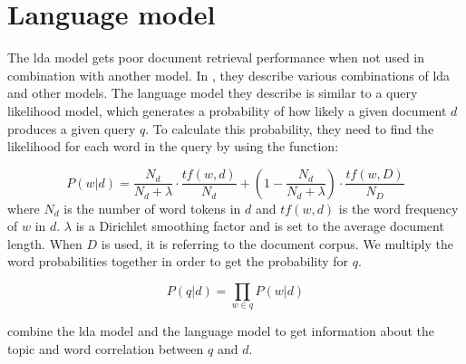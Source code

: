 \section{Language model}
The \gls{lda} model gets poor document retrieval performance when not used in combination with another model\cite{yang2009topic}.
In \cite{yang2009topic}, they describe various combinations of \gls{lda} and other models. 
The language model they describe is similar to a query likelihood model, which generates a probability of how likely a given document $d$ produces a given query $q$.
To calculate this probability, they need to find the likelihood for each word in the query by using the function:

$$ P(w|d) = \frac{N_d}{N_d + \lambda} \cdot \frac{tf(w,d)}{N_d} + (1 - \frac{N_d}{N_d + \lambda}) \cdot \frac{tf(w,D)}{N_D} $$
where $N_d$ is the number of word tokens in $d$ and $tf(w,d)$ is the word frequency of $w$ in $d$. $\lambda$ is a Dirichlet smoothing factor and is set to the average document length.
When $D$ is used, it is referring to the document corpus.
We multiply the word probabilities together in order to get the probability for $q$.

$$ P(q|d) = \prod_{w \in q} P(w|d) $$
 
\cite{yang2009topic} combine the \gls{lda} model and the language model to get information about the topic and word correlation between $q$ and $d$.
